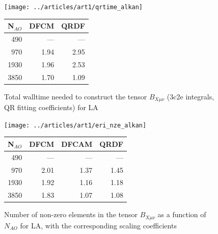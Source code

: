 \begin{figure}
\begin{minipage}[t]{0.5\textwidth}
\vspace{0pt}
\centering
\texttt{[image: ../articles/art1/qrtime\_alkan]}
\end{minipage}
\begin{minipage}[t]{0.4\textwidth}
\vspace{0pt}
\centering
\begin{tabular}{rrr}
\hline
N$_{AO}$ & DFCM & QRDF \\ \hline
490 & --- & --- \\ 
970 & 1.94 & 2.95 \\ 
1930 & 1.96 & 2.53 \\ 
3850 & 1.70 & 1.09 \\ \hline
\end{tabular}
\end{minipage}
\caption{Total walltime needed to construct the tensor $B_{X\mu\nu}$ (3c2e integrals, QR fitting coefficients) for LA}
\label{fig:GS_BTIME_ALKAN}
\end{figure}
%
%
\begin{figure}
\begin{minipage}{0.5\textwidth}
\centering
\texttt{[image: ../articles/art1/eri\_nze\_alkan]}
\end{minipage}
\begin{minipage}{0.4\textwidth}
\centering
\begin{tabular}{rrrr}
\hline
N$_{AO}$ & DFCM & DFCAM & QRDF \\ \hline
490 & --- & --- & --- \\ 
970 & 2.01 & 1.37 & 1.45 \\ 
1930 & 1.92 & 1.16 & 1.18 \\ 
3850 & 1.83 & 1.07 & 1.08 \\ \hline
\end{tabular}
\end{minipage}
\caption{Number of non-zero elements in the tensor $B_{X\mu\nu}$ as a function of $N_{AO}$ for LA, with the corresponding scaling coefficients}
\label{fig:GS_BNZE_ALKAN}
\end{figure}
%
%

